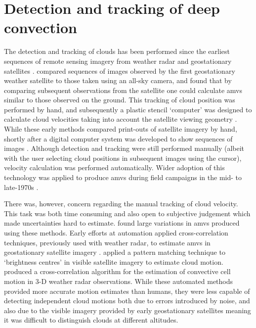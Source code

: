 \section{Detection and tracking of deep convection} \label{sec:tracking_timeline}

The detection and tracking of clouds has been performed since the earliest sequences of remote sensing imagery from weather radar and geostationary satellites \citep{menzel_cloud_2001}.
\citet{fujita_study_1968} compared sequences of images observed by the first geostationary weather satellite to those taken using an all-sky camera, and found that by comparing subsequent observations from the satellite one could calculate \acrshort{amv}s similar to those observed on the ground.
This tracking of cloud position was performed by hand, and subsequently a plastic stencil `computer' was designed to calculate cloud velocities taking into account the satellite viewing geometry \citep{fujita_present_1969}.
While these early methods compared print-outs of satellite imagery by hand, shortly after a digital computer system was developed to show sequences of images \citep{chang_metracom_1973}.
Although detection and tracking were still performed manually (albeit with the user selecting cloud positions in subsequent images using the cursor), velocity calculation was performed automatically.
Wider adoption of this technology was applied to produce \acrshort{amv}s during field campaigns in the mid- to late-1970s \citep{tecson_cloud-motion_1975}.

There was, however, concern regarding the manual tracking of cloud velocity.
This task was both time consuming and also open to subjective judgement which made uncertainties hard to estimate.
\citet{fujita_satellite-tracked_1975} found large variations in \acrshort{amv}s produced using these methods.
Early efforts at automation applied cross-correlation techniques, previously used with weather radar, to estimate \acrshort{amv}s in geostationary satellite imagery \citep{leese_determination_1970}.
\citet{endlich_use_1971} applied a pattern matching technique to `brightness centres' in visible satellite imagery to estimate cloud motion.
\citet{rinehart_three-dimensional_1978} produced a cross-correlation algorithm for the estimation of convective cell motion in 3-D weather radar observations.
While these automated methods provided more accurate motion estimates than humans, they were less capable of detecting independent cloud motions both due to errors introduced by noise, and also due to the visible imagery provided by early geostationary satellites meaning it was difficult to distinguish clouds at different altitudes.

